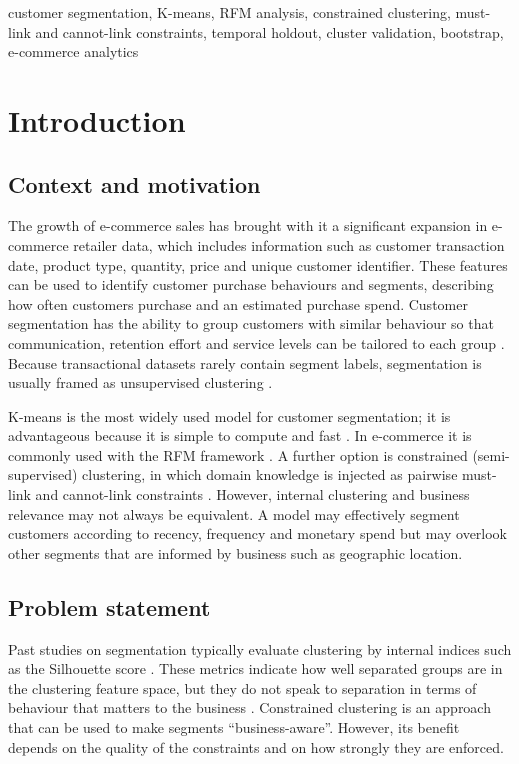 \documentclass[conference,10pt]{IEEEtran}
\begin{document}
\begin{IEEEkeywords}
customer segmentation, K-means, RFM analysis, constrained clustering,
must-link and cannot-link constraints, temporal holdout, cluster validation,
bootstrap, e-commerce analytics
\end{IEEEkeywords}

\section{Introduction}
\label{sec:intro}

\subsection{Context and motivation}
The growth of e-commerce sales has brought with it a significant expansion in e-commerce retailer data, which includes information such as customer transaction date, product type, quantity, price and unique customer identifier. These features can be used to identify customer purchase behaviours and segments, describing how often customers purchase and an estimated purchase spend. Customer segmentation has the ability to
group customers with similar behaviour so that communication, retention
effort and service levels can be tailored to each group
\cite{chen2012rfm,salminen2023algorithms}. Because transactional datasets rarely
contain segment labels, segmentation is usually framed as unsupervised
clustering \cite{wani2024comprehensive,gomes2023review}.

K-means is the most widely used model for customer segmentation; it is advantageous because it is simple to compute and
fast
\cite{macqueen1967some,gomes2023review,salminen2023algorithms}. In e-commerce it is commonly used with
the RFM framework \cite{chen2012rfm,christy2021rfm}. A further
option is constrained (semi-supervised) clustering, in which domain knowledge
is injected as pairwise must-link and cannot-link constraints
\cite{wagstaff2001constrained,basu2004probabilistic}. However, internal clustering and business relevance may not always be equivalent. A model may effectively segment customers according to recency, frequency and monetary spend but may overlook other segments that are informed by business such as geographic location.

\subsection{Problem statement}
Past studies on segmentation typically evaluate clustering by internal indices
such as the Silhouette score \cite{rousseeuw1987silhouettes}. These metrics indicate how well separated groups are in the clustering feature space, but they do not speak to separation in terms of behaviour that matters to the
business \cite{salminen2023algorithms}. Constrained
clustering is an approach that can be used to make segments ``business-aware''. However, its benefit
depends on the quality of the constraints and on how strongly they are enforced. 
\end{document}
